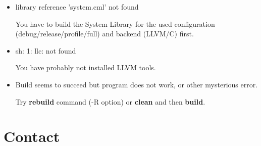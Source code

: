 \documentclass[oneside, a4paper, 11pt]{article}
\begin{document}
\begin{itemize}

\item
library reference 'system.cml' not found

You have to build the System Library for the used configuration (debug/release/profile/full) and backend (LLVM/C) first.

\item
sh: 1: llc: not found

You have probably not installed LLVM tools.

\item
Build seems to succeed but program does not work, or other mysterious error.

Try \textbf{rebuild} command (-R option) or \textbf{clean} and then \textbf{build}.

\end{itemize}

\section{Contact}

\end{document}
